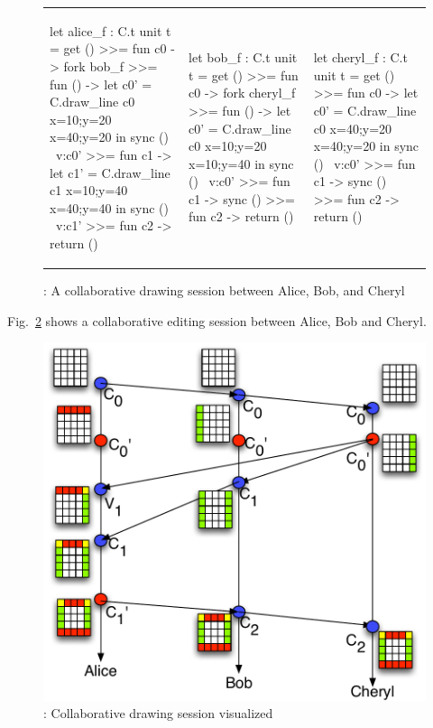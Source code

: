 \begin{figure}
\centering
\begin{tabular}{l||l||l}
\begin{ocaml}
let alice_f : C.t unit t = 
  get () >>= fun c0 -> 
  fork bob_f >>= fun () ->
  let c0' = C.draw_line c0 
    {x=10;y=20}
    {x=40;y=20} in
  sync () ~v:c0' >>= 
  fun c1 ->
  let c1' = C.draw_line c1 
    {x=10;y=40} 
    {x=40;y=40} in
  sync () ~v:c1' >>= 
  fun c2 -> return ()
\end{ocaml}
&
\begin{ocaml}
let bob_f : C.t unit t = 
  get () >>= fun c0 -> 
  fork cheryl_f >>= 
  fun () ->
  let c0' = C.draw_line c0 
    {x=10;y=20} 
    {x=10;y=40} in
  sync () ~v:c0' >>= 
  fun c1 -> sync () >>= 
  fun c2 -> return ()
\end{ocaml}
&
\begin{ocaml}
let cheryl_f : C.t unit t = 
  get () >>= fun c0 -> 
  let c0' = C.draw_line c0 
    {x=40;y=20} 
    {x=40;y=20} in
  sync () ~v:c0' >>= 
  fun c1 -> sync () >>= 
  fun c2 -> return ()
\end{ocaml}
\\
\end{tabular}
\caption{\drawsome: A collaborative drawing session between Alice,
Bob, and Cheryl}
\label{fig:canvas-sessions-code}
\end{figure}

Fig.~\ref{fig:canvas-sessions} shows a collaborative editing session
between Alice, Bob and Cheryl.

\begin{figure}
\centering
\includegraphics[scale=0.6]{Figures/canvas-sessions}

\caption{\drawsome: Collaborative drawing session visualized}
\label{fig:canvas-sessions}
\end{figure}




